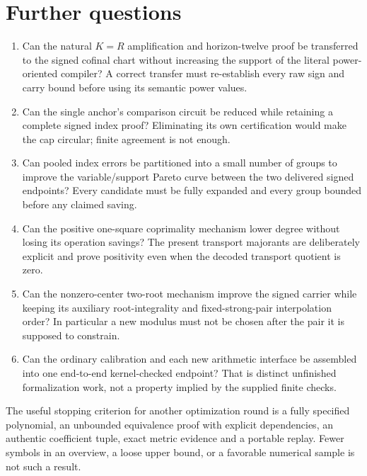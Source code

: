 \section{Further questions}
\begin{enumerate}
\item Can the natural $K=R$ amplification and horizon-twelve proof be transferred to the signed cofinal chart without increasing the support of the literal power-oriented compiler? A correct transfer must re-establish every raw sign and carry bound before using its semantic power values.
\item Can the single anchor's comparison circuit be reduced while retaining a complete signed index proof? Eliminating its own certification would make the cap circular; finite agreement is not enough.
\item Can pooled index errors be partitioned into a small number of groups to improve the variable/support Pareto curve between the two delivered signed endpoints? Every candidate must be fully expanded and every group bounded before any claimed saving.
\item Can the positive one-square coprimality mechanism lower degree without losing its operation savings? The present transport majorants are deliberately explicit and prove positivity even when the decoded transport quotient is zero.
\item Can the nonzero-center two-root mechanism improve the signed carrier while keeping its auxiliary root-integrality and fixed-strong-pair interpolation order? In particular a new modulus must not be chosen after the pair it is supposed to constrain.
\item Can the ordinary calibration and each new arithmetic interface be assembled into one end-to-end kernel-checked endpoint? That is distinct unfinished formalization work, not a property implied by the supplied finite checks.
\end{enumerate}
The useful stopping criterion for another optimization round is a fully specified polynomial, an unbounded equivalence proof with explicit dependencies, an authentic coefficient tuple, exact metric evidence and a portable replay. Fewer symbols in an overview, a loose upper bound, or a favorable numerical sample is not such a result.
